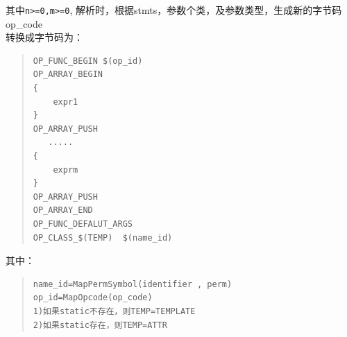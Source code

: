 \begin{enumerate}
\begin{quote}
\begin{verbatim}
\end{verbatim}
\end{quote}
其中\verb|n>=0,m>=0|, 解析时，根据stmts，参数个类，及参数类型，生成新的字节码 op\_code \\
转换成字节码为：
\begin{quote}
\begin{verbatim}
OP_FUNC_BEGIN $(op_id)
OP_ARRAY_BEGIN
{
    expr1
}
OP_ARRAY_PUSH
   .....
{
    exprm
}
OP_ARRAY_PUSH
OP_ARRAY_END
OP_FUNC_DEFALUT_ARGS
OP_CLASS_$(TEMP)  $(name_id)
\end{verbatim}
\end{quote}
其中：
\begin{quote}
\begin{verbatim}
name_id=MapPermSymbol(identifier , perm)
op_id=MapOpcode(op_code) 
1)如果static不存在，则TEMP=TEMPLATE
2)如果static存在，则TEMP=ATTR
\end{verbatim}
\end{quote}
\end{enumerate}

